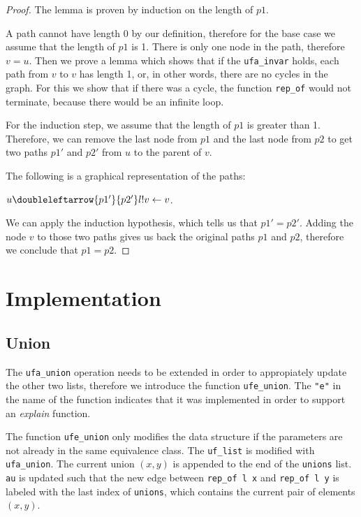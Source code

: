 \begin{proof}
The lemma is proven by induction on the length of $p1$.

A path cannot have length 0 by our definition, therefore for the base case we assume that the length of $p1$ is 1. There is only one node in the path, therefore $v = u$. Then we prove a lemma which shows that if the \lstinline{ufa_invar} holds, each path from $v$ to $v$ has length 1, or, in other words, there are no cycles in the graph. For this we show that if there was a cycle, the function \lstinline{rep_of} would not terminate, because there would be an infinite loop.

For the induction step, we assume that the length of $p1$ is greater than 1. Therefore, we can remove the last node from $p1$ and the last node from $p2$ to get two paths $p1'$ and $p2'$ from $u$ to the parent of $v$.

The following is a graphical representation of the paths:

$u\doubleleftarrow{p1'}{p2'}l!v\leftarrow v$.

We can apply the induction hypothesis, which tells us that $p1' = p2'$. Adding the node $v$ to those two paths gives us back the original paths $p1$ and $p2$, therefore we conclude that $p1 = p2$.
\end{proof}

\section{Implementation}

\subsection{Union}

The \lstinline{ufa_union} operation needs to be extended in order to appropiately update the other two lists, therefore we introduce the function \lstinline{ufe_union}. The \lstinline|"e"| in the name of the function indicates that it was implemented in order to support an \emph{explain} function.

The function \lstinline{ufe_union} only modifies the data structure if the parameters are not already in the same equivalence class.
The \lstinline{uf_list} is modified with \lstinline{ufa_union}.
The current union $(x, y)$ is appended to the end of the \lstinline{unions} list.
\lstinline{au} is updated such that the new edge between \lstinline{rep_of l x} and \lstinline{rep_of l y} is labeled with the last index of \lstinline{unions}, which contains the current pair of elements $(x, y)$.

